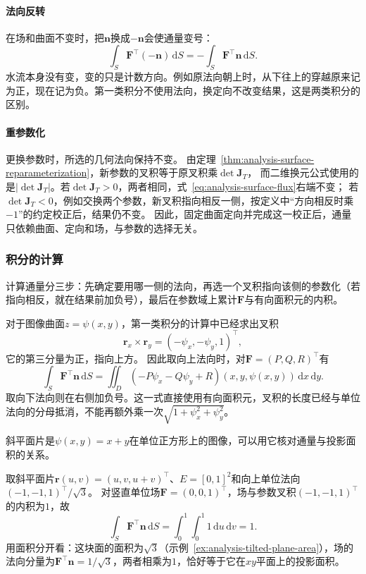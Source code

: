 \paragraph{法向反转}

在场和曲面不变时，把$\bm n$换成$-\bm n$会使通量变号：
\[
 \int_S\bm F^\top(-\bm n)\,\mathrm dS
 =-\int_S\bm F^\top\bm n\,\mathrm dS.
\]
水流本身没有变，变的只是计数方向。例如原法向朝上时，从下往上的穿越原来记为正，现在记为负。第一类积分不使用法向，换定向不改变结果，这是两类积分的区别。

\paragraph{重参数化}

更换参数时，所选的几何法向保持不变。
由定理~\ref{thm:analysis-surface-reparameterization}，新参数的叉积等于原叉积乘$\det\bm J_T$，
而二维换元公式使用的是$|\det\bm J_T|$。若$\det\bm J_T>0$，两者相同，式~\eqref{eq:analysis-surface-flux}右端不变；
若$\det\bm J_T<0$，例如交换两个参数，新叉积指向相反一侧，按定义中“方向相反时乘$-1$”的约定校正后，结果仍不变。
因此，固定曲面定向并完成这一校正后，通量只依赖曲面、定向和场，与参数的选择无关。

\subsubsection{积分的计算}

计算通量分三步：先确定要用哪一侧的法向，再选一个叉积指向该侧的参数化（若指向相反，就在结果前加负号），最后在参数域上累计$\bm F$与有向面积元的内积。

对于图像曲面$z=\psi(x,y)$，第一类积分的计算中已经求出叉积
\[
 \bm r_x\times\bm r_y=(-\psi_x,-\psi_y,1)^\top,
\]
它的第三分量为正，指向上方。
因此取向上法向时，对$\bm F=(P,Q,R)^\top$有
\[
 \int_S\bm F^\top\bm n\,\mathrm dS
 =\iint_D(-P\psi_x-Q\psi_y+R)(x,y,\psi(x,y))\,\mathrm dx\,\mathrm dy.
\]
取向下法向则在右侧加负号。这一式直接使用有向面积元，叉积的长度已经与单位法向的分母抵消，不能再额外乘一次$\sqrt{1+\psi_x^2+\psi_y^2}$。

斜平面片是$\psi(x,y)=x+y$在单位正方形上的图像，可以用它核对通量与投影面积的关系。

\begin{example}[斜平面片上的竖直通量]
\label{ex:analysis-tilted-plane-flux}
取斜平面片$\bm r(u,v)=(u,v,u+v)^\top$、$E=[0,1]^2$和向上单位法向$(-1,-1,1)^\top/\sqrt3$。
对竖直单位场$\bm F=(0,0,1)^\top$，场与参数叉积$(-1,-1,1)^\top$的内积为$1$，故
\[
 \int_S\bm F^\top\bm n\,\mathrm dS
 =\int_0^1\int_0^1 1\,\mathrm du\,\mathrm dv=1.
\]
用面积分开看：这块面的面积为$\sqrt3$（示例~\ref{ex:analysis-tilted-plane-area}），场的法向分量为$\bm F^\top\bm n=1/\sqrt3$，两者相乘为$1$，恰好等于它在$xy$平面上的投影面积。
\end{example}

